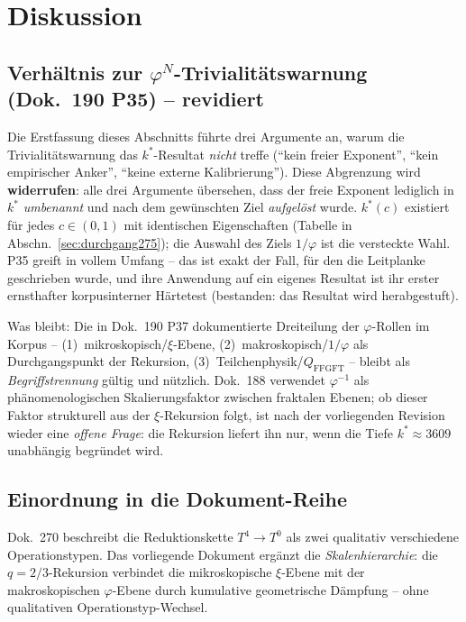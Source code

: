 \section{Diskussion}

\subsection{Verhältnis zur $\varphi^N$-Trivialitätswarnung (Dok.~190 P35) -- revidiert}

\begin{remark}
Die Erstfassung dieses Abschnitts führte drei Argumente an, warum die
Trivialitätswarnung das $k^*$-Resultat \emph{nicht} treffe
(\enquote{kein freier Exponent}, \enquote{kein empirischer Anker},
\enquote{keine externe Kalibrierung}). Diese Abgrenzung wird
\textbf{widerrufen}: alle drei Argumente übersehen, dass der freie
Exponent lediglich in $k^*$ \emph{umbenannt} und nach dem gewünschten
Ziel \emph{aufgelöst} wurde. $k^*(c)$ existiert für jedes $c\in(0,1)$
mit identischen Eigenschaften (Tabelle in
Abschn.~\ref{sec:durchgang275}); die Auswahl des Ziels $1/\varphi$
ist die versteckte Wahl. P35 greift in vollem Umfang -- das ist
exakt der Fall, für den die Leitplanke geschrieben wurde, und ihre
Anwendung auf ein eigenes Resultat ist ihr erster ernsthafter
korpusinterner Härtetest (bestanden: das Resultat wird herabgestuft).
\end{remark}

Was bleibt: Die in Dok.~190 P37 dokumentierte Dreiteilung der
$\varphi$-Rollen im Korpus -- (1)~mikroskopisch/$\xi$-Ebene,
(2)~makroskopisch/$1/\varphi$ als Durchgangspunkt der Rekursion,
(3)~Teilchenphysik/$Q_\mathrm{FFGFT}$ -- bleibt als
\emph{Begriffstrennung} gültig und nützlich. Dok.~188 verwendet
$\varphi^{-1}$ als phänomenologischen Skalierungsfaktor zwischen
fraktalen Ebenen; ob dieser Faktor strukturell aus der
$\xi$-Rekursion folgt, ist nach der vorliegenden Revision wieder eine
\emph{offene Frage}: die Rekursion liefert ihn nur, wenn die Tiefe
$k^*\approx3609$ unabhängig begründet wird.

\subsection{Einordnung in die Dokument-Reihe}

Dok.~270 beschreibt die Reduktionskette $T^4\to T^0$ als zwei qualitativ
verschiedene Operationstypen. Das vorliegende Dokument ergänzt die
\emph{Skalenhierarchie}: die $q=2/3$-Rekursion verbindet die mikroskopische
$\xi$-Ebene mit der makroskopischen $\varphi$-Ebene durch kumulative
geometrische Dämpfung -- ohne qualitativen Operationstyp-Wechsel.

